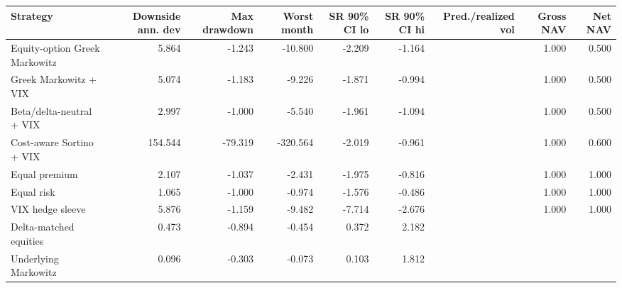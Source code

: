\begin{tabular}{lrrrrrrrr}
\toprule
Strategy & Downside ann. dev & Max drawdown & Worst month & SR 90\% CI lo & SR 90\% CI hi & Pred./realized vol & Gross NAV & Net NAV \\
\midrule
Equity-option Greek Markowitz & 5.864 & -1.243 & -10.800 & -2.209 & -1.164 &  & 1.000 & 0.500 \\
Greek Markowitz + VIX & 5.074 & -1.183 & -9.226 & -1.871 & -0.994 &  & 1.000 & 0.500 \\
Beta/delta-neutral + VIX & 2.997 & -1.000 & -5.540 & -1.961 & -1.094 &  & 1.000 & 0.500 \\
Cost-aware Sortino + VIX & 154.544 & -79.319 & -320.564 & -2.019 & -0.961 &  & 1.000 & 0.600 \\
Equal premium & 2.107 & -1.037 & -2.431 & -1.975 & -0.816 &  & 1.000 & 1.000 \\
Equal risk & 1.065 & -1.000 & -0.974 & -1.576 & -0.486 &  & 1.000 & 1.000 \\
VIX hedge sleeve & 5.876 & -1.159 & -9.482 & -7.714 & -2.676 &  & 1.000 & 1.000 \\
Delta-matched equities & 0.473 & -0.894 & -0.454 & 0.372 & 2.182 &  &  &  \\
Underlying Markowitz & 0.096 & -0.303 & -0.073 & 0.103 & 1.812 &  &  &  \\
\bottomrule
\end{tabular}
